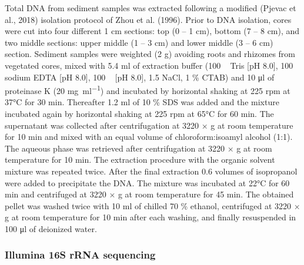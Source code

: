 \documentclass[12pt,]{article}
\begin{document}
Total DNA from sediment samples was extracted following a modified
(Pjevac et al., 2018) isolation protocol of Zhou et al. (1996). Prior to
DNA isolation, cores were cut into four different 1 \si{\cm} sections:
top (0 -- 1 \si{\cm}), bottom (7 -- 8 \si{\cm}), and two middle
sections: upper middle (1 -- 3 \si{\cm}) and lower middle (3 -- 6
\si{\cm}) section. Sediment samples were weighted (2 \si{\g}) avoiding
roots and rhizomes from vegetated cores, mixed with 5.4 \si{\ml} of
extraction buffer (100 \si{\milli\Molar} Tris {[}pH 8.0{]}, 100
\si{\milli\Molar} sodium EDTA {[}pH 8.0{]}, 100 \si{\milli\Molar}
 {[}pH 8.0{]}, 1.5 \si{\Molar} NaCl, 1 \si{\percent} CTAB)
and 10 \si{\ul} of proteinase K (20 \si{\mg\per\ml}) and incubated by
horizontal shaking at 225 rpm at 37\si{\degreeCelsius} for 30
\si{\minute}. Thereafter 1.2 \si{\ml} of 10 \si{\percent} SDS was added
and the mixture incubated again by horizontal shaking at 225 rpm at
65\si{\degreeCelsius} for 60 \si{\minute}. The supernatant was collected
after centrifugation at 3220 × g at room temperature for 10 \si{\minute}
and mixed with an equal volume of chloroform:isoamyl alcohol (1:1). The
aqueous phase was retrieved after centrifugation at 3220 × g at room
temperature for 10 \si{\minute}. The extraction procedure with the
organic solvent mixture was repeated twice. After the final extraction
0.6 volumes of isopropanol were added to precipitate the DNA. The
mixture was incubated at 22\si{\degreeCelsius} for 60 \si{\minute} and
centrifuged at 3220 × g at room temperature for 45 \si{\minute}. The
obtained pellet was washed twice with 10 \si{\ml} of chilled 70
\si{\percent} ethanol, centrifuged at 3220 × g at room temperature for
10 \si{\minute} after each washing, and finally resuspended in 100
\si{\ul} of deionized water.

\hypertarget{illumina-16s-rrna-sequencing}{%
\subsubsection{Illumina 16S rRNA
sequencing}\label{illumina-16s-rrna-sequencing}}
\end{document}
